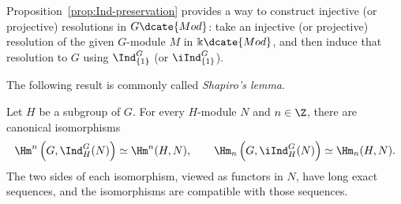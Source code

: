 Proposition~\ref{prop:Ind-preservation} provides a way to construct injective
(or projective) resolutions in $G\dcate{Mod}$: take an injective (or
projective) resolution of the given $G$-module $M$ in
$\Bbbk\dcate{Mod}$, and then induce that resolution to $G$ using
$\Ind^G_{\{1\}}$ (or $\iInd^G_{\{1\}}$).

The following result is commonly called \emph{Shapiro's lemma}.

\begin{theorem}
\label{prop:Shapiro}
	Let $H$ be a subgroup of $G$. For every $H$-module $N$ and
	$n\in\Z$, there are canonical isomorphisms
	\[ \Hm^n\left(G,\Ind^G_H(N)\right)\simeq\Hm^n(H,N),\qquad
	\Hm_n\left(G,\iInd^G_H(N)\right)\simeq\Hm_n(H,N). \]
	The two sides of each isomorphism, viewed as functors in $N$, have long
	exact sequences, and the isomorphisms are compatible with those
	sequences.
\end{theorem}
